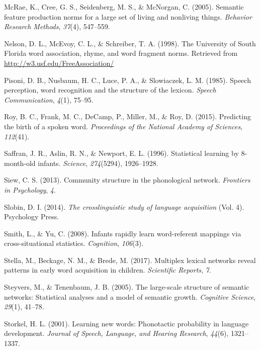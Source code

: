 \documentclass[english,,man,floatsintext]{apa6}
\begin{document}
\leavevmode\hypertarget{ref-mcrae2005}{}%
McRae, K., Cree, G. S., Seidenberg, M. S., \& McNorgan, C. (2005). Semantic feature production norms for a large set of living and nonliving things. \emph{Behavior Research Methods}, \emph{37}(4), 547--559.

\leavevmode\hypertarget{ref-nelson1998}{}%
Nelson, D. L., McEvoy, C. L., \& Schreiber, T. A. (1998). The University of South Florida word association, rhyme, and word fragment norms. Retrieved from \url{http://w3.usf.edu/FreeAssociation/}

\leavevmode\hypertarget{ref-pisoni1985}{}%
Pisoni, D. B., Nusbaum, H. C., Luce, P. A., \& Slowiaczek, L. M. (1985). Speech perception, word recognition and the structure of the lexicon. \emph{Speech Communication}, \emph{4}(1), 75--95.

\leavevmode\hypertarget{ref-roy2015}{}%
Roy, B. C., Frank, M. C., DeCamp, P., Miller, M., \& Roy, D. (2015). Predicting the birth of a spoken word. \emph{Proceedings of the National Academy of Sciences}, \emph{112}(41).

\leavevmode\hypertarget{ref-saffran1996}{}%
Saffran, J. R., Aslin, R. N., \& Newport, E. L. (1996). Statistical learning by 8-month-old infants. \emph{Science}, \emph{274}(5294), 1926--1928.

\leavevmode\hypertarget{ref-siew2013}{}%
Siew, C. S. (2013). Community structure in the phonological network. \emph{Frontiers in Psychology}, \emph{4}.

\leavevmode\hypertarget{ref-slobin2014}{}%
Slobin, D. I. (2014). \emph{The crosslinguistic study of language acquisition} (Vol. 4). Psychology Press.

\leavevmode\hypertarget{ref-smith2008}{}%
Smith, L., \& Yu, C. (2008). Infants rapidly learn word-referent mappings via cross-situational statistics. \emph{Cognition}, \emph{106}(3).

\leavevmode\hypertarget{ref-stella2017}{}%
Stella, M., Beckage, N. M., \& Brede, M. (2017). Multiplex lexical networks reveal patterns in early word acquisition in children. \emph{Scientific Reports}, \emph{7}.

\leavevmode\hypertarget{ref-steyvers2005}{}%
Steyvers, M., \& Tenenbaum, J. B. (2005). The large-scale structure of semantic networks: Statistical analyses and a model of semantic growth. \emph{Cognitive Science}, \emph{29}(1), 41--78.

\leavevmode\hypertarget{ref-storkel2001}{}%
Storkel, H. L. (2001). Learning new words: Phonotactic probability in language development. \emph{Journal of Speech, Language, and Hearing Research}, \emph{44}(6), 1321--1337.
\end{document}

